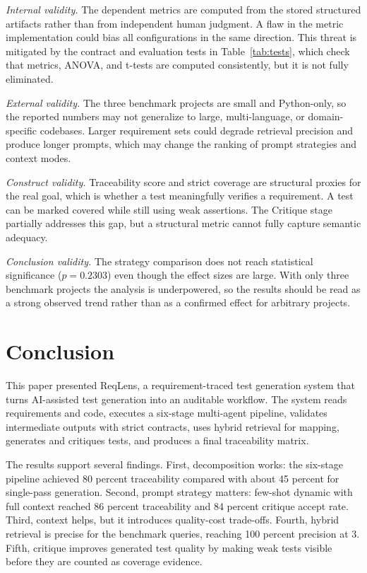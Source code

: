 \documentclass[conference]{IEEEtran}
\begin{document}
\textit{Internal validity.} The dependent metrics are computed from the stored
structured artifacts rather than from independent human judgment. A flaw in
the metric implementation could bias all configurations in the same direction.
This threat is mitigated by the contract and evaluation tests in
Table~\ref{tab:tests}, which check that metrics, ANOVA, and t-tests are
computed consistently, but it is not fully eliminated.

\textit{External validity.} The three benchmark projects are small and
Python-only, so the reported numbers may not generalize to large,
multi-language, or domain-specific codebases. Larger requirement sets could
degrade retrieval precision and produce longer prompts, which may change the
ranking of prompt strategies and context modes.

\textit{Construct validity.} Traceability score and strict coverage are
structural proxies for the real goal, which is whether a test meaningfully
verifies a requirement. A test can be marked covered while still using weak
assertions. The Critique stage partially addresses this gap, but a structural
metric cannot fully capture semantic adequacy.

\textit{Conclusion validity.} The strategy comparison does not reach
statistical significance ($p = 0.2303$) even though the effect sizes are
large. With only three benchmark projects the analysis is underpowered, so
the results should be read as a strong observed trend rather than as a
confirmed effect for arbitrary projects.

\section{Conclusion}
This paper presented ReqLens, a requirement-traced test generation system that
turns AI-assisted test generation into an auditable workflow. The system reads
requirements and code, executes a six-stage multi-agent pipeline, validates
intermediate outputs with strict contracts, uses hybrid retrieval for mapping,
generates and critiques tests, and produces a final traceability matrix.

The results support several findings. First, decomposition works: the
six-stage pipeline achieved 80 percent traceability compared with about 45
percent for single-pass generation. Second, prompt strategy matters:
few-shot dynamic with full context reached 86 percent traceability and 84
percent critique accept rate. Third, context helps, but it introduces
quality-cost trade-offs. Fourth, hybrid retrieval is precise for the benchmark
queries, reaching 100 percent precision at 3. Fifth, critique improves
generated test quality by making weak tests visible before they are counted as
coverage evidence.
\end{document}
